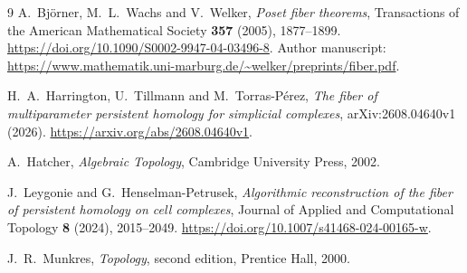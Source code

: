 \documentclass[11pt,a4paper]{article}
\begin{document}
\begin{thebibliography}{9}
A.~Bj\"orner, M.~L.~Wachs and V.~Welker,
\emph{Poset fiber theorems},
Transactions of the American Mathematical Society \textbf{357} (2005),
1877--1899. \url{https://doi.org/10.1090/S0002-9947-04-03496-8}.
Author manuscript: \url{https://www.mathematik.uni-marburg.de/~welker/preprints/fiber.pdf}.

H.~A.~Harrington, U.~Tillmann and M.~Torras-P\'erez,
\emph{The fiber of multiparameter persistent homology for simplicial complexes},
arXiv:2608.04640v1 (2026). \url{https://arxiv.org/abs/2608.04640v1}.

A.~Hatcher, \emph{Algebraic Topology},
Cambridge University Press, 2002.

J.~Leygonie and G.~Henselman-Petrusek,
\emph{Algorithmic reconstruction of the fiber of persistent homology on cell complexes},
Journal of Applied and Computational Topology \textbf{8} (2024), 2015--2049.
\url{https://doi.org/10.1007/s41468-024-00165-w}.

J.~R.~Munkres, \emph{Topology}, second edition,
Prentice Hall, 2000.
\end{thebibliography}
\end{document}
